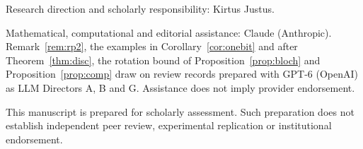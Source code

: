 \documentclass[11pt,a4paper]{article}
\begin{document}
\begin{titlepage}
\vfill
{\small Research direction and scholarly responsibility: Kirtus Justus.\par
Mathematical, computational and editorial assistance: Claude (Anthropic).
Remark~\ref{rem:rp2}, the examples in Corollary~\ref{cor:onebit} and after Theorem~\ref{thm:disc}, the rotation bound of Proposition~\ref{prop:bloch} and Proposition~\ref{prop:comp} draw on review records prepared with GPT-6 (OpenAI) as LLM Directors A, B and G.
Assistance does not imply provider endorsement.\par
This manuscript is prepared for scholarly assessment. Such preparation does not establish independent peer review,
experimental replication or institutional endorsement.\par}
\end{titlepage}
\setcounter{page}{2}
\setcounter{section}{0}

\clearpage
\end{document}
